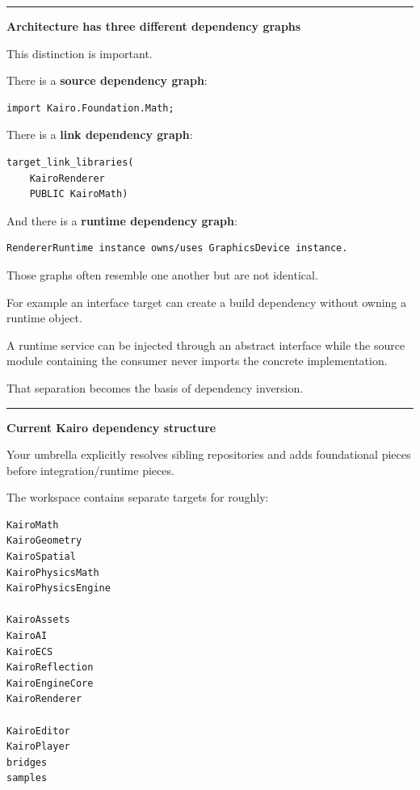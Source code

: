 \begin{center}\rule{0.5\linewidth}{0.5pt}\end{center}

\textbf{Architecture has three different dependency graphs}

This distinction is important.

There is a \textbf{source dependency graph}:

\begin{verbatim}
import Kairo.Foundation.Math;
\end{verbatim}

There is a \textbf{link dependency graph}:

\begin{verbatim}
target_link_libraries(
    KairoRenderer
    PUBLIC KairoMath)
\end{verbatim}

And there is a \textbf{runtime dependency graph}:

\begin{verbatim}
RendererRuntime instance owns/uses GraphicsDevice instance.
\end{verbatim}

Those graphs often resemble one another but are not identical.

For example an interface target can create a build dependency without owning a runtime object.

A runtime service can be injected through an abstract interface while the source module containing the consumer never imports the concrete implementation.

That separation becomes the basis of dependency inversion.

\begin{center}\rule{0.5\linewidth}{0.5pt}\end{center}

\textbf{Current Kairo dependency structure}

Your umbrella  explicitly resolves sibling repositories and adds foundational pieces before integration/runtime pieces.

The workspace contains separate targets for roughly:

\begin{verbatim}
KairoMath
KairoGeometry
KairoSpatial
KairoPhysicsMath
KairoPhysicsEngine

KairoAssets
KairoAI
KairoECS
KairoReflection
KairoEngineCore
KairoRenderer

KairoEditor
KairoPlayer
bridges
samples
\end{verbatim}

